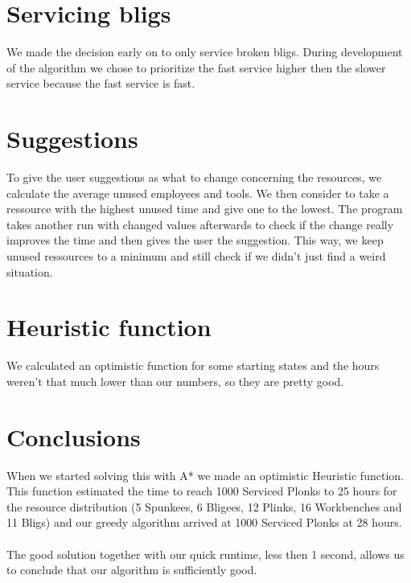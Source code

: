 \documentclass{article}
\begin{document}
\section*{Servicing bligs}
We made the decision early on to only service broken bligs. During development of the algorithm we chose to prioritize the fast service higher then the slower service because the fast service is fast.

\section*{Suggestions}
To give the user suggestions as what to change concerning the resources, we calculate the average unused employees and tools. We then consider to take a ressource with the highest unused time and give one to the lowest. The program takes another run with changed values afterwards to check if the change really improves the time and then gives the user the suggestion.
This way, we keep unused ressources to a minimum and still check if we didn't just find a weird situation.

\section*{Heuristic function}
We calculated an optimistic function for some starting states and the hours weren't that much lower than our numbers, so they are pretty good.

\section*{Conclusions}
When we started solving this with A* we made an optimistic Heuristic function. This function estimated the time to reach 1000 Serviced Plonks to 25 hours for the resource distribution (5 Spunkees, 6 Bligees, 12 Plinks, 16 Workbenches and 11 Bligs) and our greedy algorithm arrived at 1000 Serviced Plonks at 28 hours.
\\ \\
The good solution together with our quick runtime, less then 1 second, allows us to conclude that our algorithm is sufficiently good.
\end{document}
